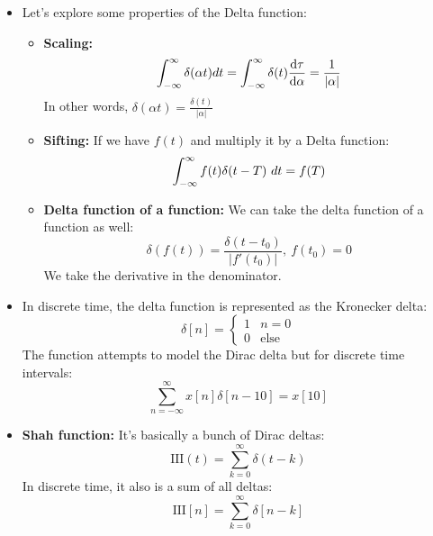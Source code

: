 \begin{itemize}
	\item Let's explore some properties of the Delta function: 
		\begin{itemize}
			\item \textbf{Scaling:} 
				\[
					\int_{-\infty}^{\infty} \delta(\alpha t) dt = \int_{-\infty}^{\infty} \delta(t) \dv{\tau}{\alpha}
					= \frac{1}{|\alpha|}
				\] 
				In other words, \( \delta(\alpha t) = \frac{\delta(t)}{|\alpha|} \)
			\item \textbf{Sifting:} If we have \( f(t) \) and multiply it by a Delta function:
				\[
				\int_{-\infty}^{\infty} f(t) \delta(t - T) \ d t = f(T) 
				\] 
			\item \textbf{Delta function of a function:} We can take the delta function of a function as well:
				\[
				\delta(f(t)) = \frac{\delta(t - t_0)}{|f'(t_0)|}, \ f(t_0) = 0
				\] 
				We take the derivative in the denominator. 
		\end{itemize}
	\item In discrete time, the delta function is represented as the Kronecker delta:
		\[
			\delta[n] = \begin{cases}
				1 & n = 0\\
				0 & \text{else}
			\end{cases}
		\] 
		The function attempts to model the Dirac delta but for discrete time intervals:
		\[
			\sum_{n =-\infty}^{\infty}x[n] \delta[n - 10] = x[10]
		\] 
	\item \textbf{Shah function:} It's basically a bunch of Dirac deltas:
		\[
			\text{III}(t) = \sum_{k= 0}^{\infty}\delta(t - k)
		\] 
		In discrete time, it also is a sum of all deltas:
		\[
			\text{III}[n] = \sum_{k = 0}^{\infty}\delta[n - k]
		\] 
\end{itemize}

